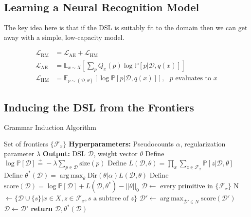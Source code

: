 \documentclass{article}
\DeclareMathOperator*{\argmax}{arg\,max} %
\newcommand{\expect}{\mathds{E}} %
\newcommand{\probability}{\mathds{P}} %
\begin{document}
\subsection{Learning a Neural Recognition Model}\label{recognitionSection}
The key idea here is that if the DSL is suitably fit to the domain then
we can get away with a simple, low-capacity model.

\begin{align}
  \mathcal{L}_{\text{RM}}& = \mathcal{L}_\text{AE} + \mathcal{L}_\text{HM}\\
  \mathcal{L}_{\text{AE}}& = \expect_{x\sim X}\left[\sum_p Q_x(p)\log \probability [p|\mathcal{D},q(x)]\right]\nonumber\\
    \mathcal{L}_{\text{HM}}& = \expect_{p\sim(\mathcal{D},\theta) }\left[\log \probability[p|\mathcal{D},q(x)]\right],\text{ $p$ evaluates to $x$}\nonumber
\end{align}

\subsection{Inducing the DSL from the Frontiers}\label{grammarInductionSection}


\begin{algorithm}[tb]
   \caption{Grammar Induction Algorithm}
   \label{grammarInductionAlgorithm}
   \begin{algorithmic}
      Set of frontiers $\{\mathcal{F}_x\}$
     \STATE \textbf{Hyperparameters:} Pseudocounts $\alpha$, regularization parameter $\lambda$
     \STATE \textbf{Output:} DSL $\mathcal{D}$, weight vector $\theta$
     \STATE Define $\log \probability[\mathcal{D}]\stackrel{+}{ = } -\lambda\sum_{p\in \mathcal{D}} \text{size}(p)$
     \STATE Define $L(\mathcal{D},\theta) =  \prod_x \sum_{z\in \mathcal{F}_x} \probability[z|\mathcal{D},\theta]$
     \STATE Define $\theta^*(\mathcal{D}) = \argmax_\theta \text{Dir}(\theta|\alpha) L(\mathcal{D},\theta)$
     \STATE Define $\text{score}(\mathcal{D}) = \log \probability[\mathcal{D}] + L(\mathcal{D},\theta^*) - ||\theta||_0$
     \STATE $\mathcal{D}\gets$ every primitive in $\{\mathcal{F}_x\}$
     \STATE N $\gets \{\mathcal{D}\cup \{s\} | x\in X, z\in \mathcal{F}_x, s\text{ a subtree of }z\}$
     \STATE $\mathcal{D}'\gets \argmax_{\mathcal{D}'\in N}\text{score}(\mathcal{D}') $
     \STATE $\mathcal{D}\gets\mathcal{D}'$
     \ELSE
     \STATE\textbf{return} $\mathcal{D},\theta^*(\mathcal{D})$
     \ENDIF
     \ENDWHILE
   \end{algorithmic}
\end{algorithm}
\end{document}
